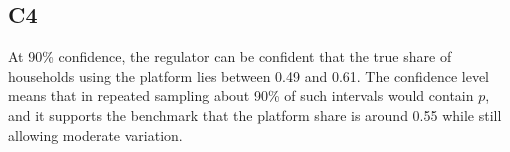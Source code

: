 \begin{ExamProblems}
		\subsection*{C4}
		At 90\% confidence, the regulator can be confident that the true share of households using the platform lies between 0.49 and 0.61. The confidence level means that in repeated sampling about 90\% of such intervals would contain $p$, and it supports the benchmark that the platform share is around 0.55 while still allowing moderate variation.
	\end{ExamProblems}

